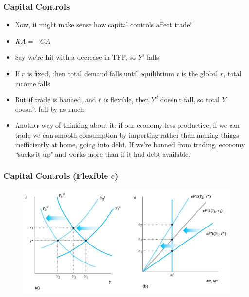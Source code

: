 \documentclass{beamer}
\begin{document}
\begin{frame}
\frametitle[alignment=center]{ Capital Controls}
\begin{itemize}
\item Now, it might make sense how capital controls affect trade!
\bigskip
\item $KA=-CA$
\bigskip
\item Say we're hit with a decrease in TFP, so $Y^s$ falls
\bigskip
\item If $r$ is fixed, then total demand falls until equilibrium $r$ is the global $r$, total income falls
\bigskip
\item But if trade is banned, and $r$ is flexible, then $Y^d$ doesn't fall, so total $Y$ doesn't fall by as much
\bigskip
\item Another way of thinking about it:  if our economy less productive, if we can trade we can smooth consumption by importing rather than making things inefficiently at home, going into debt.  If we're banned from trading, economy ``sucks it up" and works more than if it had debt available.
\end{itemize}
\end{frame}

\begin{frame}
\frametitle[alignment=center]{Capital Controls (Flexible $e$)}
\begin{figure}
\centering
\includegraphics[scale=0.5]{Figures/W_Fig_17pt11.png}
\end{figure}
\end{frame}
\end{document}
